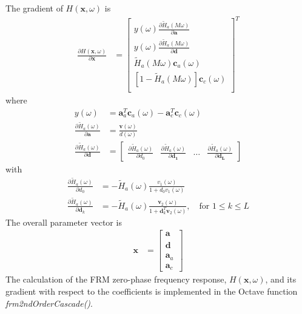 \documentclass[a4paper,twoside,10pt,english]{report}
\begin{document}
The gradient of $H\left(\boldsymbol{x},\omega\right)$ is
\begin{align*}
\frac{\partial H\left(\boldsymbol{x},\omega\right)}{\partial \boldsymbol{x}} &=
\left[ \begin{array}{c}
y\left(\omega\right)\frac{\partial \tilde{H}_{a}\left(M\omega\right)}
{\partial \boldsymbol{a}}\\
y\left(\omega\right)\frac{\partial \tilde{H}_{a}\left(M\omega\right)}
{\partial \boldsymbol{d}}\\
\tilde{H}_{a}\left(M\omega\right)\boldsymbol{c}_{a}\left(\omega\right)\\
\left[ 1-\tilde{H}_{a}\left(M\omega\right)\right]
\boldsymbol{c}_{c}\left(\omega\right)\\
\end{array}\right]^{T}
\end{align*}
where
\begin{align*}
y\left(\omega\right)&=\boldsymbol{a}_{a}^{T}\boldsymbol{c}_{a}\left(\omega\right)-
\boldsymbol{a}_{c}^{T}\boldsymbol{c}_{c}\left(\omega\right)\\
\frac{\partial \tilde{H}_{a}\left(\omega\right)}{\partial\boldsymbol{a}}&=
\frac{\boldsymbol{v}\left(\omega\right)}{d\left(\omega\right)}\\
\frac{\partial \tilde{H}_{a}\left(\omega\right)}{\partial\boldsymbol{d}}&=
\left[\begin{array}{cccc}
\frac{\partial \tilde{H}_{a}\left(\omega\right)}{\partial d_{0}}&
\frac{\partial \tilde{H}_{a}\left(\omega\right)}{\partial\boldsymbol{d_{1}}}&
\hdots&
\frac{\partial \tilde{H}_{a}\left(\omega\right)}{\partial\boldsymbol{d_{L}}}
\end{array}\right]
\end{align*}
with
\begin{align*}
\frac{\partial \tilde{H}_{a}\left(\omega\right)}{\partial d_{0}}&=
-\tilde{H}_{a}\left(\omega\right)\frac{v_{1}\left(\omega\right)}
{1+d_{0}v_{1}\left(\omega\right)}\\
\frac{\partial \tilde{H}_{a}\left(\omega\right)}{\partial \boldsymbol{d}_{k}}&=
-\tilde{H}_{a}\left(\omega\right)\frac{\boldsymbol{v}_{2}\left(\omega\right)}
{1+\boldsymbol{d}_{k}^{T}\boldsymbol{v}_{2}\left(\omega\right)},\quad
\text{for $1\le k \le L$}
\end{align*}
The overall parameter vector is
\begin{align*}
\boldsymbol{x}&=\left[\begin{array}{c}
\boldsymbol{a}\phantom{_{a}}\\
\boldsymbol{d}\phantom{_{a}}\\
\boldsymbol{a}_{a}\\
\boldsymbol{a}_{c}
\end{array}\right]
\end{align*}
The calculation of the FRM zero-phase frequency response,
$H\left(\boldsymbol{x},\omega\right)$, and its gradient with respect to the 
coefficients is implemented in the Octave function \emph{frm2ndOrderCascade()}.
\end{document}

